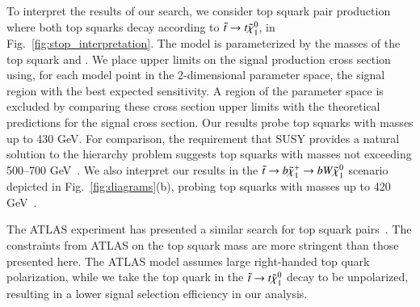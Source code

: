 

To interpret the results of our search, we consider top squark pair production where both top squarks decay according to 
$\tilde{t}\to t\tilde{\chi}_{1}^{0}$, in Fig.~\ref{fig:stop_interpretation}.
The model is parameterized by the masses of the top squark and \lsp. We place upper limits on the signal
production cross section using, for each model point in the 2-dimensional parameter space, the signal region with the best expected
sensitivity. A region of the parameter space is excluded by comparing these cross section upper limits with the theoretical predictions 
for the signal cross section.
Our results probe top squarks with masses up to 430 GeV. For comparison, the requirement that SUSY
provides a natural solution to the hierarchy problem suggests top squarks with masses not exceeding 500--700 GeV~\cite{ref:naturalsusy}.
We also interpret our results in the $\tilde{t}\to b\tilde{\chi}_{1}^{+}\to b W \tilde{\chi}_{1}^{0}$ scenario
depicted in Fig.~\ref{fig:diagrams}(b), probing top squarks with masses up to 420 GeV~\cite{ref:stop}.

The ATLAS experiment has presented a similar search for top squark pairs~\cite{ref:atlasstop}.
The constraints from ATLAS on the top squark mass are more stringent than those presented here. The ATLAS model assumes large 
right-handed top quark polarization, while we take the top quark in the $\tilde{t}\to t\tilde{\chi}_{1}^{0}$ decay to be unpolarized, 
resulting in a lower signal selection efficiency in our analysis.

